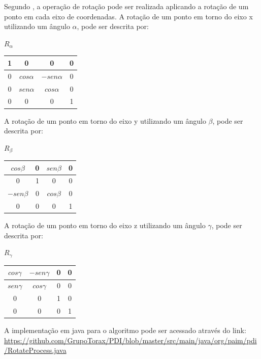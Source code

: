 \documentclass[
	12pt,				%
	oneside,			%
	a4paper,			%
	english,			%
	french,				%
	spanish,			%
	brazil,				%
	]{abntex2}
\begin{document}
Segundo \citet{pedriniSchwartz:2008}, a operação de rotação pode ser realizada aplicando a rotação de um ponto em cada eixo de coordenadas. A rotação de um ponto em torno do eixo x utilizando um ângulo \(\alpha\), pode ser descrita por:

\(R_\alpha\)
\begin{tabular}{|c|c|c|c|}
	\hline
    1 &             0 &              0 & 0   \\ \hline
	0 & \(cos\alpha\) & \(-sen\alpha\) & 0   \\ \hline   
	0 & \(sen\alpha\) &  \(cos\alpha\) & 0   \\ \hline   
	0 &             0 &              0 & 1   \\ \hline   
\end{tabular}

A rotação de um ponto em torno do eixo y utilizando um ângulo \(\beta\), pode ser descrita por:

\(R_\beta\)
\begin{tabular}{|c|c|c|c|}
	\hline
     \(cos\beta\) & 0 & \(sen\beta\) & 0   \\ \hline
	            0 & 1 & 0            & 0   \\ \hline   
	\(-sen\beta\) & 0 & \(cos\beta\) & 0   \\ \hline   
                0 & 0 &            0 & 1   \\ \hline   
\end{tabular}

A rotação de um ponto em torno do eixo z utilizando um ângulo \(\gamma\), pode ser descrita por:

\(R_\gamma\)
\begin{tabular}{|c|c|c|c|}
	\hline
    \(cos\gamma\) & \(-sen\gamma\) & 0 & 0   \\ \hline
	\(sen\gamma\) &  \(cos\gamma\) & 0 & 0   \\ \hline   
	            0 &              0 & 1 & 0   \\ \hline   
                0 &              0 & 0 & 1   \\ \hline   
\end{tabular}

A implementação em java para o algoritmo pode ser acessado através do link: \url{https://github.com/GrupoTorax/PDI/blob/master/src/main/java/org/paim/pdi/RotateProcess.java}
\end{document}

